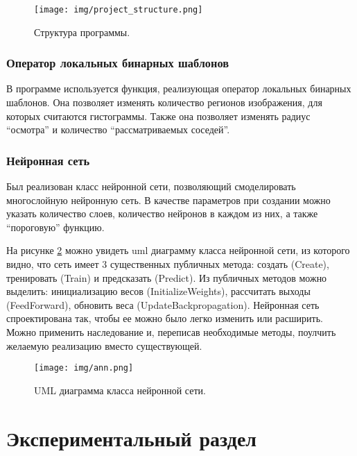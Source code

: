 \documentclass[a4paper,12pt]{report}
\numberwithin{equation}{section}
\begin{document}
\begin{figure}[h!]
  \centering
  \texttt{[image: img/project\_structure.png]}
  \caption{Структура программы.}
  \label{fig:proj-struct}
\end{figure}

\subsubsection{Оператор локальных бинарных шаблонов}
В программе используется функция, реализующая оператор локальных бинарных
шаблонов. Она позволяет изменять количество регионов изображения, для 
которых считаются гистограммы. Также она позволяет изменять радиус
``осмотра'' и количество ``рассматриваемых соседей''.

\subsubsection{Нейронная сеть}
Был реализован класс нейронной сети, позволяющий смоделировать
многослойную нейронную сеть. В качестве параметров при создании можно
указать количество слоев, количество нейронов в каждом из них, а также
``пороговую'' функцию.


На рисунке \ref{fig:ann-uml} можно увидеть uml диаграмму класса нейронной сети,
из которого видно, что сеть имеет 3 существенных публичных метода: 
создать (Create), тренировать (Train) и предсказать (Predict). Из публичных 
методов можно выделить: инициализацию весов (InitializeWeights), рассчитать
выходы (FeedForward), обновить веса (UpdateBackpropagation). Нейронная сеть
спроектирована так, чтобы ее можно было легко изменить или расширить.
Можно применить наследование и, переписав необходимые методы, поулчить желаемую
реализацию вместо существующей.

\begin{figure}[h!]
  \centering
  \texttt{[image: img/ann.png]}
  \caption{UML диаграмма класса нейронной сети.}
  \label{fig:ann-uml}
\end{figure}


\section{Экспериментальный раздел}
\end{document}
